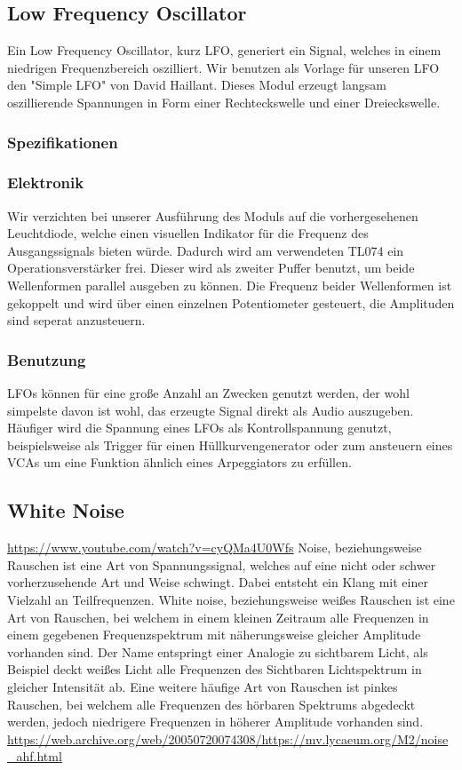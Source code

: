 \subsection{Low Frequency Oscillator}
\label{sec:org482ba97}
Ein Low Frequency Oscillator, kurz LFO, generiert ein Signal, welches in einem niedrigen Frequenzbereich oszilliert. Wir benutzen als Vorlage für unseren LFO den "Simple LFO" von David Haillant. Dieses Modul erzeugt langsam oszillierende Spannungen in Form einer Rechteckswelle und einer Dreieckswelle.
\subsubsection{Spezifikationen}
\label{sec:orga3647dc}
\subsubsection{Elektronik}
\label{sec:orgb6288b2}
Wir verzichten bei unserer Ausführung des Moduls auf die vorhergesehenen Leuchtdiode, welche einen visuellen Indikator für die Frequenz des Ausgangssignals bieten würde. Dadurch wird am verwendeten TL074 ein Operationsverstärker frei. Dieser wird als zweiter Puffer benutzt, um beide Wellenformen parallel ausgeben zu können. Die Frequenz beider Wellenformen ist gekoppelt und wird über einen einzelnen Potentiometer gesteuert, die Amplituden sind seperat anzusteuern.

\subsubsection{Benutzung}
\label{sec:orge318773}

LFOs können für eine große Anzahl an Zwecken genutzt werden, der wohl simpelste davon ist wohl, das erzeugte Signal direkt als Audio auszugeben. Häufiger wird die Spannung eines LFOs als Kontrollspannung genutzt, beispielsweise als Trigger für einen Hüllkurvengenerator oder zum ansteuern eines VCAs um eine Funktion ähnlich eines Arpeggiators zu erfüllen.

\subsection{White Noise}
\label{sec:org6a9d460}
\url{https://www.youtube.com/watch?v=cyQMa4U0Wfs}
Noise, beziehungsweise Rauschen ist eine Art von Spannungssignal, welches auf eine nicht oder schwer vorherzusehende Art und Weise schwingt. Dabei entsteht ein Klang mit einer Vielzahl an Teilfrequenzen. White noise, beziehungsweise weißes Rauschen ist eine Art von Rauschen, bei welchem in einem kleinen Zeitraum alle Frequenzen in einem gegebenen Frequenzspektrum mit näherungsweise gleicher Amplitude vorhanden sind. Der Name entspringt einer Analogie zu sichtbarem Licht, als Beispiel deckt weißes Licht alle Frequenzen des Sichtbaren Lichtspektrum in gleicher Intensität ab. Eine weitere häufige Art von Rauschen ist pinkes Rauschen, bei welchem alle Frequenzen des hörbaren Spektrums abgedeckt werden, jedoch niedrigere Frequenzen in höherer Amplitude vorhanden sind.
\url{https://web.archive.org/web/20050720074308/https://mv.lycaeum.org/M2/noise\_ahf.html}

